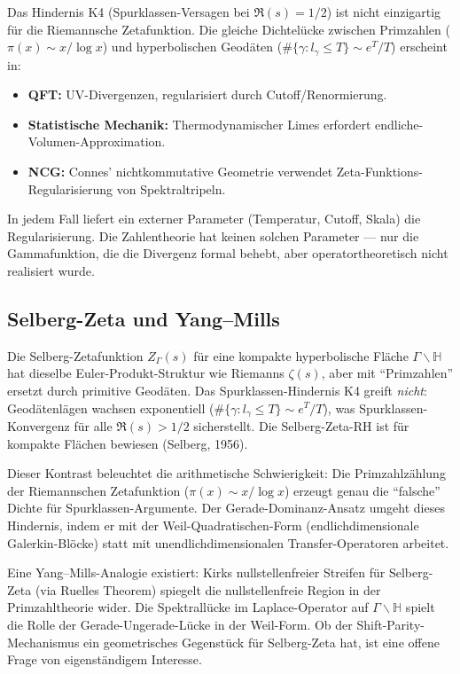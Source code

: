 \documentclass[12pt,a4paper]{article}
\theoremstyle{definition}
\theoremstyle{remark}
\begin{document}
Das Hindernis K4 (Spurklassen-Versagen bei $\Re(s) = 1/2$) ist nicht einzigartig für die Riemannsche Zetafunktion. Die gleiche Dichtelücke zwischen Primzahlen ($\pi(x) \sim x/\log x$) und hyperbolischen Geodäten ($\#\{\gamma: l_\gamma \leq T\} \sim e^T/T$) erscheint in:
\begin{itemize}
  \item \textbf{QFT:} UV-Divergenzen, regularisiert durch Cutoff/Renormierung.
  \item \textbf{Statistische Mechanik:} Thermodynamischer Limes erfordert endliche-Volumen-Approximation.
  \item \textbf{NCG:} Connes' nichtkommutative Geometrie verwendet Zeta-Funktions-Regularisierung von Spektraltripeln.
\end{itemize}
In jedem Fall liefert ein externer Parameter (Temperatur, Cutoff, Skala) die Regularisierung. Die Zahlentheorie hat keinen solchen Parameter --- nur die Gammafunktion, die die Divergenz formal behebt, aber operatortheoretisch nicht realisiert wurde.

\subsection{Selberg-Zeta und Yang--Mills}

Die Selberg-Zetafunktion $Z_\Gamma(s)$ für eine kompakte hyperbolische Fläche $\Gamma \backslash \mathbb{H}$ hat dieselbe Euler-Produkt-Struktur wie Riemanns $\zeta(s)$, aber mit ``Primzahlen'' ersetzt durch primitive Geodäten. Das Spurklassen-Hindernis K4 greift \emph{nicht}: Geodätenlägen wachsen exponentiell ($\#\{\gamma: l_\gamma \leq T\} \sim e^T/T$), was Spurklassen-Konvergenz für alle $\Re(s) > 1/2$ sicherstellt. Die Selberg-Zeta-RH ist für kompakte Flächen bewiesen (Selberg, 1956).

Dieser Kontrast beleuchtet die arithmetische Schwierigkeit: Die Primzahlzählung der Riemannschen Zetafunktion ($\pi(x) \sim x/\log x$) erzeugt genau die ``falsche'' Dichte für Spurklassen-Argumente. Der Gerade-Dominanz-Ansatz umgeht dieses Hindernis, indem er mit der Weil-Quadratischen-Form (endlichdimensionale Galerkin-Blöcke) statt mit unendlichdimensionalen Transfer-Operatoren arbeitet.

Eine Yang--Mills-Analogie existiert: Kirks nullstellenfreier Streifen für Selberg-Zeta (via Ruelles Theorem) spiegelt die nullstellenfreie Region in der Primzahltheorie wider. Die Spektrallücke im Laplace-Operator auf $\Gamma \backslash \mathbb{H}$ spielt die Rolle der Gerade-Ungerade-Lücke in der Weil-Form. Ob der Shift-Parity-Mechanismus ein geometrisches Gegenstück für Selberg-Zeta hat, ist eine offene Frage von eigenständigem Interesse.
\end{document}
